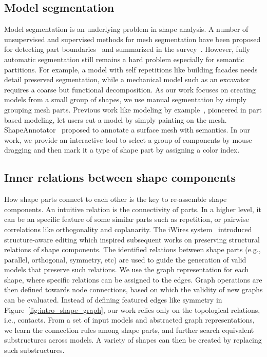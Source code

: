 \subsection{Model segmentation}

Model segmentation is an underlying problem in shape analysis. A number of unsupervised and supervised methods for mesh segmentation have been proposed for detecting part boundaries~\cite{Sidi11,Wang12} and summarized in the survey~\cite{shamir2008survey}. However, fully automatic segmentation still remains a hard problem especially for semantic partitions. For example, a model with self repetitions like building facades needs detail preserved segmentation, while a mechanical model such as an excavator requires a coarse but functional decomposition. As our work focuses on creating models from a small group of shapes, we use manual segmentation by simply grouping mesh parts. Previous work like modeling by example~\cite{Funkhouser2004}, pioneered in part based modeling, let users cut a model by simply painting on the mesh. ShapeAnnotator~\cite{attene:09} proposed to annotate a surface mesh with semantics. In our work, we provide an interactive tool to select a group of components by mouse dragging and then mark it a type of shape part by assigning a color index.

\subsection{Inner relations between shape components}

How shape parts connect to each other is the key to re-assemble shape components. An intuitive relation is the connectivity of parts. In a higher level, it can be an specific feature of some similar parts such as repetition, or pairwise correlations like orthogonality and coplanarity. The iWires system~\cite{Gal2009} introduced structure-aware editing which inspired subsequent works on preserving structural relations of shape components. The identified relations between shape parts (e.g., parallel, orthogonal, symmetry, etc) are used to guide the generation of valid models that preserve such relations. We use the graph representation for each shape, where specific relations can be assigned to the edges. Graph operations are then defined towards node connections, based on which the validity of new graphs can be evaluated. Instead of defining featured edges like symmetry in Figure~\ref{fig:intro_shape_graph}, our work relies only on the topological relations, i.e., contacts. From a set of input models and abstracted graph representations, we learn the connection rules among shape parts, and further search equivalent substructures across models. A variety of shapes can then be created by replacing such substructures.

